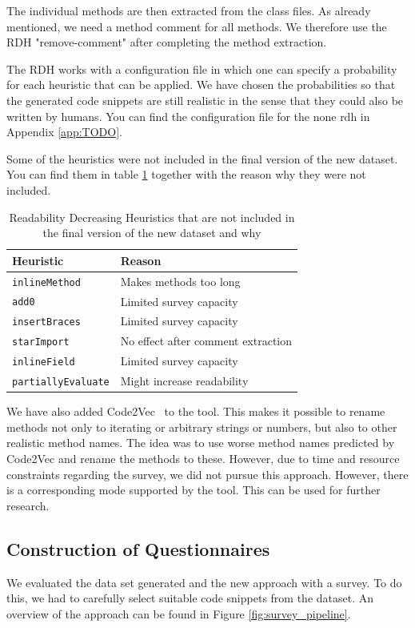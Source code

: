 \documentclass[%
class=scrreprt,
chapterprefix=false,%
open=right,%
twoside=false,%
paper=a4,%
logofile={Logo\_zentral\_farbig\_EN.png},%
thesistype=master,%
UKenglish,%
]{se2thesis}
\theoremstyle{definition}
\begin{document}
	The individual methods are then extracted from the class files. As already mentioned, we need a method comment for all methods. We therefore use the RDH "remove-comment" after completing the method extraction.
	
	The RDH works with a configuration file in which one can specify a probability for each heuristic that can be applied. We have chosen the probabilities so that the generated code snippets are still realistic in the sense that they could also be written by humans. You can find the configuration file for the none rdh in Appendix \ref{app:TODO}.
	
	Some of the heuristics were not included in the final version of the new dataset. You can find them in table \ref{tab:not-included-rdhs} together with the reason why they were not included.
	
	\begin{table}[h]
		\centering
		\caption{Readability Decreasing Heuristics that are not included in the final version of the new dataset and why}
		\vspace{8pt}
		\label{tab:not-included-rdhs}
		\begin{tabular}{ll}
			\toprule
			\textbf{Heuristic} & \textbf{Reason} \\
			\midrule
			\texttt{inlineMethod} & Makes methods too long \\
			\texttt{add0} & Limited survey capacity \\
			\texttt{insertBraces} & Limited survey capacity \\
			\texttt{starImport} & No effect after comment extraction \\
			\texttt{inlineField} & Limited survey capacity \\
			\texttt{partiallyEvaluate} & Might increase readability \\
			\bottomrule
		\end{tabular}
	\end{table}
	
	We have also added Code2Vec~\cite{alon2019code2vec} to the tool. This makes it possible to rename methods not only to iterating or arbitrary strings or numbers, but also to other realistic method names. The idea was to use worse method names predicted by Code2Vec and rename the methods to these. However, due to time and resource constraints regarding the survey, we did not pursue this approach.	However, there is a corresponding mode supported by the tool. This can be used for further research.
	
\subsection{Construction of Questionnaires} \label{Construction of Questionnaires}
	We evaluated the data set generated and the new approach with a survey. To do this, we had to carefully select suitable code snippets from the dataset. An overview of the approach can be found in Figure \ref{fig:survey_pipeline}.
	
\end{document}

